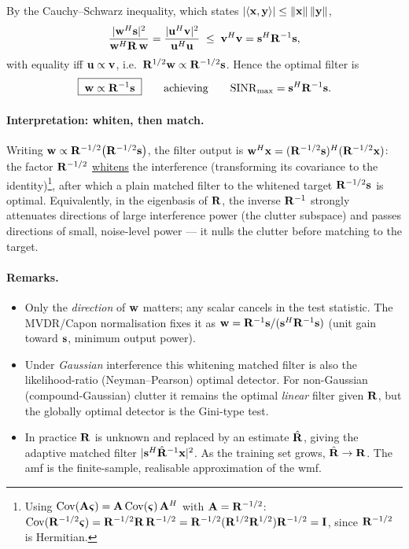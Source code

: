 \documentclass{article}
\begin{document}
By the Cauchy--Schwarz inequality, which states $|\langle \vb x, \vb y\rangle| \leq \lVert \vb x\rVert\,\lVert \vb y\rVert$,
\[
  \frac{|\vb w^H\vb s|^2}{\vb w^H\vb R\,\vb w}
  = \frac{|\vb u^H\vb v|^2}{\vb u^H\vb u}
  \;\le\; \vb v^H\vb v = \vb s^H\vb R^{-1}\vb s,
\]
with equality iff $\vb u \propto \vb v$, i.e.\ $\vb R^{1/2}\vb w \propto \vb R^{-1/2}\vb s$.
Hence the optimal filter is
\[
  \boxed{\;\vb w \propto \vb R^{-1}\vb s\;}
  \qquad\text{achieving}\qquad
  \mathrm{SINR}_{\max} = \vb s^H\vb R^{-1}\vb s.
\]

\paragraph{Interpretation: whiten, then match.}
Writing $\vb w \propto \vb R^{-1/2}\big(\vb R^{-1/2}\vb s\big)$, the filter output is $\vb w^H\vb x = (\vb R^{-1/2}\vb s)^H(\vb R^{-1/2}\vb x)$: the factor $\vb R^{-1/2}$ \underline{whitens} the interference (transforming its covariance to the identity)\footnote{Using $\mathrm{Cov}(\mathbf{A}\boldsymbol{\varsigma})=\mathbf{A}\,\mathrm{Cov}(\boldsymbol{\varsigma})\,\mathbf{A}^H$ with $\mathbf{A}=\mathbf{R}^{-1/2}$:
$\mathrm{Cov}(\mathbf{R}^{-1/2}\boldsymbol{\varsigma})=\mathbf{R}^{-1/2}\mathbf{R}\,\mathbf{R}^{-1/2}
=\mathbf{R}^{-1/2}(\mathbf{R}^{1/2}\mathbf{R}^{1/2})\mathbf{R}^{-1/2}=\mathbf{I}$, since $\mathbf{R}^{-1/2}$ is Hermitian.}, after which a plain matched filter to the whitened target $\vb R^{-1/2}\vb s$ is optimal. Equivalently, in the eigenbasis of $\vb R$, the inverse $\vb R^{-1}$ strongly attenuates directions of large interference power (the clutter subspace) and passes directions of small, noise-level power --- it nulls the clutter before matching to the target.

\paragraph{Remarks.}
\begin{itemize}
  \item Only the \emph{direction} of $\vb w$ matters; any scalar cancels in the test
  statistic. The MVDR/Capon normalisation fixes it as
  $\vb w = \vb R^{-1}\vb s/(\vb s^H\vb R^{-1}\vb s)$ (unit gain toward $\vb s$,
  minimum output power).
  \item Under \emph{Gaussian} interference this whitening matched filter is also the likelihood-ratio (Neyman--Pearson) optimal detector. For non-Gaussian (compound-Gaussian) clutter it remains the optimal \emph{linear} filter given $\vb R$, but the globally optimal detector is the Gini-type test.
  \item In practice $\vb R$ is unknown and replaced by an estimate $\hat{\vb R}$, giving the adaptive matched filter $|\vb s^H\hat{\vb R}^{-1}\vb x|^2$. As the training set grows, $\hat{\mathbf{R}} \rightarrow\mathbf{R}$. The \gls{amf} is the finite-sample, realisable approximation of the \gls{wmf}.
\end{itemize}
\end{document}
